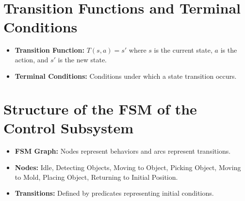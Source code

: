 \documentclass[12pt]{report}
\begin{document}
\section{Transition Functions and Terminal Conditions}
\begin{itemize}
    \item \textbf{Transition Function:} \( T(s, a) = s' \) where \( s \) is the current state, \( a \) is the action, and \( s' \) is the new state.
    \item \textbf{Terminal Conditions:} Conditions under which a state transition occurs.
\end{itemize}

\section{Structure of the FSM of the Control Subsystem}
\begin{itemize}
    \item \textbf{FSM Graph:} Nodes represent behaviors and arcs represent transitions.
    \item \textbf{Nodes:} Idle, Detecting Objects, Moving to Object, Picking Object, Moving to Mold, Placing Object, Returning to Initial Position.
    \item \textbf{Transitions:} Defined by predicates representing initial conditions.
\end{itemize}
\end{document}
